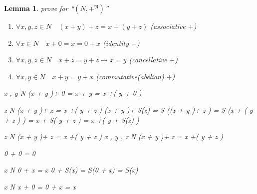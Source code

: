 \documentclass[10pt,a4paper]{book}
\newtheorem{lemma}{Lemma}[section]
\begin{document}
\begin{lemma}prove for ``$(N , +^{\mathfrak{N}})$''
    \begin{enumerate}
        \setlength{\itemsep}{0pt} %
        \item       $\forall x , y , z  \in N \quad (x + y )+ z  = x +( y + z )  $ (associative $+$)
        \item       $\forall x  \in N \quad  x + 0 = x = 0 + x   $ (identity  $+$)
        \item       $\forall x , y , z  \in N \quad x  +  z  =  y  +  z   \to x  =  y  $ (cancellative  $+$)
        \item       $\forall x , y  \in N \quad x + y  =  y + x $  (commutative(abelian)  $+$)
    \end{enumerate}

    \begin{fitchproof}[arrayenv=tabular]

        \open
         { x , y   \in N }   
         { (x +  y )+  0 = x +  y  = x +( y +  0 )}    

        \open
         {  z  \in N }   
        \open
         { (x +  y )+  z  = x +( y +  z )}                 
         { (x +  y )+  S(z) =  S \big((x +  y )+  z \big) =  S \big(x +  ( y +  z ) \big) = x +  S( y +  z ) = x +( y +  S(z) )}     
        \close
        \close


         {\forall   z  \in N \quad (x +  y )+  z  = x +( y +  z )}     
        \close
         {\forall x , y , z  \in N \quad (x +  y )+  z  = x +( y +  z )}     

    \end{fitchproof}

    \begin{fitchproof}[arrayenv=tabular]

         {  0 +  0  = 0 }                 

        \open
         { x   \in N }   
        \open
         {  0 +  x  = x }     
         {  0 +  S(x)  = S(0 +  x)  = S(x) }     
        \close

        \close
         {\forall x  \in N \quad x  +  0 = 0 +  x  = x}      

    \end{fitchproof}


\end{lemma}
\end{document}
